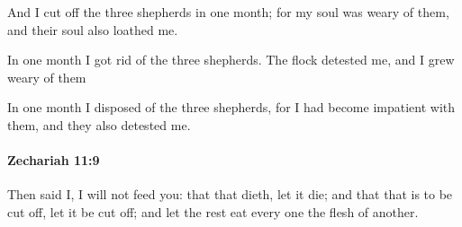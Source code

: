 			\begin{versebox}
					\item[BHS] 
					\item[LXX] 
					\item[ASV] And I cut off the three shepherds in one month; for my soul was weary of them, and their soul also loathed me.
					\item[NIV] In one month I got rid of the three shepherds. The flock detested me, and I grew weary of them
					\item[NRSV] In one month I disposed of the three shepherds, for I had become impatient with them, and they also detested me.
			\end{versebox}

		\paragraph{Zechariah 11:9} %
			\label{ZECHARIAH-11-9}

			Then said I, I will not feed you: that that dieth, let it die; and that that is to be cut off, let it be cut off; and let the rest eat every one the flesh of another.

